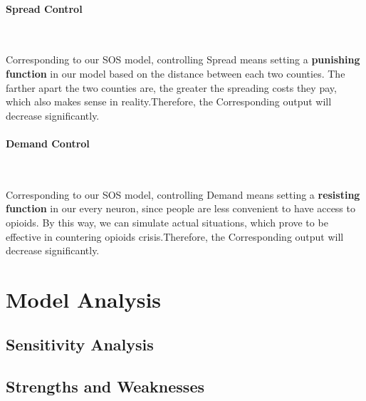 \documentclass{mcmthesis}
\begin{document}
\paragraph{\textbf{Spread Control}}

~\smallskip

Corresponding to our SOS model, controlling Spread means setting a \textbf{punishing function }in our model based on the distance between each two counties. The farther apart the two counties are, the greater the spreading costs they pay, which also makes sense in reality.Therefore, the Corresponding output will decrease significantly.
\paragraph{\textbf{Demand Control}}

~\smallskip

Corresponding to our SOS model, controlling Demand means setting a \textbf{resisting function} in our every neuron, since people are less convenient to have access to opioids. By this way, we can simulate actual situations, which prove to be effective in countering opioids crisis.Therefore, the Corresponding output will decrease significantly.
\section{Model Analysis}\label{Sec-Analysis}

\subsection{Sensitivity Analysis}

\subsection{Strengths and Weaknesses}
\end{document}
